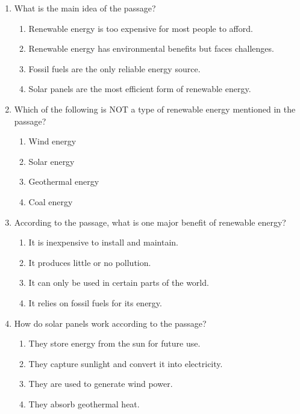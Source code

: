 \documentclass[12pt]{article}
\begin{document}
\begin{enumerate}

    \item What is the main idea of the passage?
    \begin{enumerate}[label=\Alph*.]
        \item Renewable energy is too expensive for most people to afford.
        \item Renewable energy has environmental benefits but faces challenges.
        \item Fossil fuels are the only reliable energy source.
        \item Solar panels are the most efficient form of renewable energy.
    \end{enumerate}
    \vspace{0.5cm}

    \item Which of the following is NOT a type of renewable energy mentioned in the passage?
    \begin{enumerate}[label=\Alph*.]
        \item Wind energy
        \item Solar energy
        \item Geothermal energy
        \item Coal energy
    \end{enumerate}
    \vspace{0.5cm}

    \item According to the passage, what is one major benefit of renewable energy?
    \begin{enumerate}[label=\Alph*.]
        \item It is inexpensive to install and maintain.
        \item It produces little or no pollution.
        \item It can only be used in certain parts of the world.
        \item It relies on fossil fuels for its energy.
    \end{enumerate}
    \vspace{0.5cm}

    \item How do solar panels work according to the passage?
    \begin{enumerate}[label=\Alph*.]
        \item They store energy from the sun for future use.
        \item They capture sunlight and convert it into electricity.
        \item They are used to generate wind power.
        \item They absorb geothermal heat.
    \end{enumerate}
    \vspace{0.5cm}


\end{enumerate}
\end{document}
